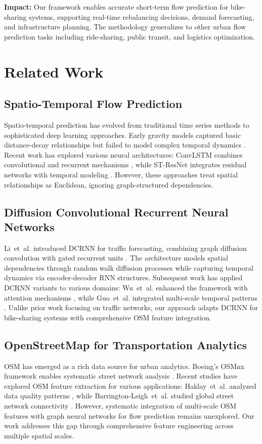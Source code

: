 \documentclass[twocolumn,11pt]{IEEEtran}
\begin{document}
\textbf{Impact:} Our framework enables accurate short-term flow prediction for bike-sharing systems, supporting real-time rebalancing decisions, demand forecasting, and infrastructure planning. The methodology generalizes to other urban flow prediction tasks including ride-sharing, public transit, and logistics optimization.

\section{Related Work}

\subsection{Spatio-Temporal Flow Prediction}
Spatio-temporal prediction has evolved from traditional time series methods to sophisticated deep learning approaches. Early gravity models captured basic distance-decay relationships but failed to model complex temporal dynamics \cite{flowml1}. Recent work has explored various neural architectures: ConvLSTM combines convolutional and recurrent mechanisms \cite{xingjian2015}, while ST-ResNet integrates residual networks with temporal modeling \cite{zhang2017}. However, these approaches treat spatial relationships as Euclidean, ignoring graph-structured dependencies.

\subsection{Diffusion Convolutional Recurrent Neural Networks}
Li~et~al. introduced DCRNN for traffic forecasting, combining graph diffusion convolution with gated recurrent units \cite{li2018}. The architecture models spatial dependencies through random walk diffusion processes while capturing temporal dynamics via encoder-decoder RNN structures. Subsequent work has applied DCRNN variants to various domains: Wu~et~al. enhanced the framework with attention mechanisms \cite{wu2019}, while Guo~et~al. integrated multi-scale temporal patterns \cite{guo2020}. Unlike prior work focusing on traffic networks, our approach adapts DCRNN for bike-sharing systems with comprehensive OSM feature integration.

\subsection{OpenStreetMap for Transportation Analytics}
OSM has emerged as a rich data source for urban analytics. Boeing's OSMnx framework enables systematic street network analysis \cite{boeing2017}. Recent studies have explored OSM feature extraction for various applications: Haklay~et~al. analyzed data quality patterns \cite{haklay2010}, while Barrington-Leigh~et~al. studied global street network connectivity \cite{barrington2017}. However, systematic integration of multi-scale OSM features with graph neural networks for flow prediction remains unexplored. Our work addresses this gap through comprehensive feature engineering across multiple spatial scales.
\end{document}
